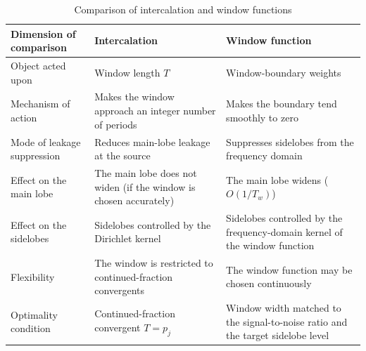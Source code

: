 \begin{table}[htbp]
\centering
\caption{Comparison of intercalation and window functions}
\label{tab:intercalation_vs_window}
\begin{tabularx}{\linewidth}{@{}>{\raggedright\arraybackslash\hspace{0pt}}p{3cm}*{2}{>{\raggedright\arraybackslash\hspace{0pt}}X}@{}}
\toprule
Dimension of comparison & Intercalation & Window function \\
\midrule
Object acted upon & Window length $T$ & Window-boundary weights \\
Mechanism of action & Makes the window approach an integer number of periods & Makes the boundary tend smoothly to zero \\
Mode of leakage suppression & Reduces main-lobe leakage at the source & Suppresses sidelobes from the frequency domain \\
Effect on the main lobe & The main lobe does not widen (if the window is chosen accurately) & The main lobe widens ($O(1/T_w)$) \\
Effect on the sidelobes & Sidelobes controlled by the Dirichlet kernel & Sidelobes controlled by the frequency-domain kernel of the window function \\
Flexibility & The window is restricted to continued-fraction convergents & The window function may be chosen continuously \\
Optimality condition & Continued-fraction convergent $T=p_j$ & Window width matched to the signal-to-noise ratio and the target sidelobe level \\
\bottomrule
\end{tabularx}
\end{table}

